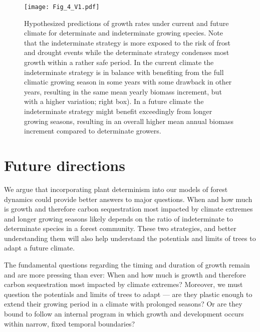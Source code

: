 \documentclass{article}
\begin{document}
								\begin{figure}
								\centering
								\texttt{[image: Fig\_4\_V1.pdf]} 
								\caption{Hypothesized predictions of growth rates under current and future climate for determinate and indeterminate growing species. Note that the indeterminate strategy is more exposed to the risk of frost and drought events while the determinate strategy condenses most growth within a rather safe period. In the current climate the indeterminate strategy is in balance with benefiting from the full climatic growing season in some years with some drawback in other years, resulting in the same mean yearly biomass increment, but with a higher variation; right box). In a future climate the indeterminate strategy might benefit exceedingly from longer growing seasons, resulting in an overall higher mean annual biomass increment compared to determinate growers.}
								\label{fig:fig_4xxx}
							\end{figure}
	\pagebreak
\section*{Future directions}

We argue that incorporating plant determinism into our models of forest dynamics could provide better answers to major questions. When and how much is growth and therefore carbon sequestration most impacted by climate extremes and longer growing seasons likely depends on the ratio of indeterminate to determinate species in a forest community. These two strategies, and better understanding them will also help understand the potentials and limits of trees to adapt a future climate.

The fundamental questions regarding the timing and duration of growth remain and are more pressing than ever: When and how much is growth and therefore carbon sequestration most impacted by climate extremes? Moreover, we must question the potentials and limits of trees to adapt --- are they plastic enough to extend their growing period in a climate with prolonged seasons? Or are they bound to follow an internal program in which growth and development occurs within narrow, fixed temporal boundaries? 
\end{document}
